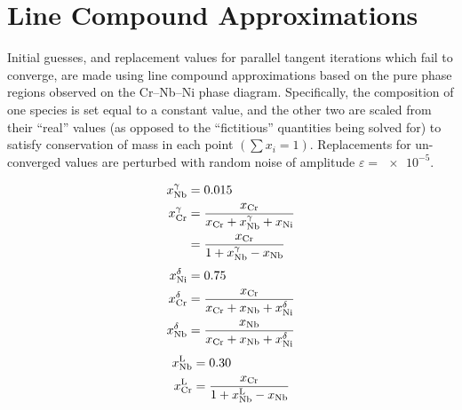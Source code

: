 \documentclass[10pt]{article}
\begin{document}
	\section{Line Compound Approximations}\label{app:linecomp}
		Initial guesses, and replacement values for parallel tangent iterations which fail to converge,
		are made using line compound approximations based on the pure phase regions observed on the Cr--Nb--Ni phase diagram.
		Specifically, the composition of one species is set equal to a constant value,
		and the other two are scaled from their ``real'' values (as opposed to the ``fictitious'' quantities being solved for)
		to satisfy conservation of mass in each point $\left(\sum x_i=1\right)$.
		Replacements for un-converged values are perturbed with random noise of amplitude $\varepsilon=\num{e-5}$.
		
		\begin{align*}
			x_{\ce{Nb}}^{\gamma} &= 0.015\\
			x_{\ce{Cr}}^{\gamma} &= \frac{x_{\ce{Cr}}}{x_{\ce{Cr}} + x_{\ce{Nb}}^{\gamma} + x_{\ce{Ni}}}\\
			                                      &= \frac{x_{\ce{Cr}}}{1 + x_{\ce{Nb}}^{\gamma} - x_{\ce{Nb}}} 
		\end{align*}
		\begin{align*}
			x_{\ce{Ni}}^{\delta} &= 0.75\\
			x_{\ce{Cr}}^{\delta} &= \frac{x_{\ce{Cr}}}{x_{\ce{Cr}} + x_{\ce{Nb}} + x_{\ce{Ni}}^{\delta}}\\
			x_{\ce{Nb}}^{\delta} &= \frac{x_{\ce{Nb}}}{x_{\ce{Cr}} + x_{\ce{Nb}} + x_{\ce{Ni}}^{\delta}}
		\end{align*}
		\begin{align*}
			x_{\ce{Nb}}^{\ce{L}} &= 0.30\\
			x_{\ce{Cr}}^{\ce{L}} &= \frac{x_{\ce{Cr}}}{1 + x_{\ce{Nb}}^{\ce{L}} - x_{\ce{Nb}}}
		\end{align*}
\end{document}
